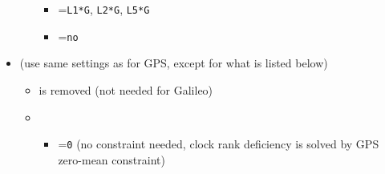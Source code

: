 \begin{itemize}
\begin{itemize}
\begin{itemize}
      \item {}=\verb|L1*G|, \verb|L2*G|, \verb|L5*G|
      \item {}=\verb|no|
    \end{itemize}
  \end{itemize}
  \item {} (use same settings as for GPS, except for
        what is listed below)
  \begin{itemize}
    \item {} is removed (not needed for Galileo)
    \item {}
    \begin{itemize}
      \item {}=\verb|0| (no constraint needed, clock rank deficiency is solved by
            GPS zero-mean constraint)
    \end{itemize}
  \end{itemize}
\end{itemize}

